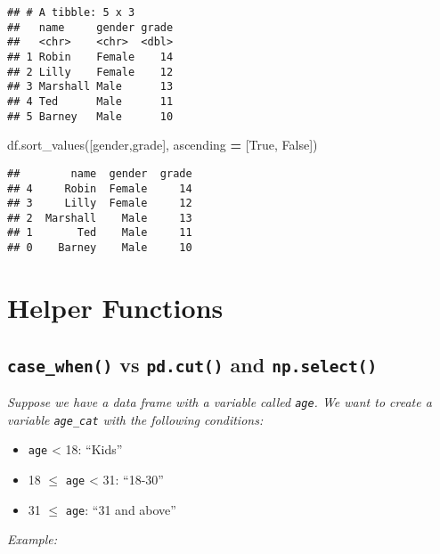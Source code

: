 \documentclass[
]{book}
\newenvironment{Shaded}{\begin{snugshade}}{\end{snugshade}}
\newcommand{\NormalTok}[1]{#1}
\newcommand{\OperatorTok}[1]{\textcolor[rgb]{0.81,0.36,0.00}{\textbf{#1}}}
\newcommand{\StringTok}[1]{\textcolor[rgb]{0.31,0.60,0.02}{#1}}
\newcommand{\VariableTok}[1]{\textcolor[rgb]{0.00,0.00,0.00}{#1}}
\begin{document}
\begin{verbatim}
## # A tibble: 5 x 3
##   name     gender grade
##   <chr>    <chr>  <dbl>
## 1 Robin    Female    14
## 2 Lilly    Female    12
## 3 Marshall Male      13
## 4 Ted      Male      11
## 5 Barney   Male      10
\end{verbatim}

\begin{Shaded}
\begin{Highlighting}[]
\NormalTok{df.sort\_values([}\StringTok{\textquotesingle{}gender\textquotesingle{}}\NormalTok{,}\StringTok{\textquotesingle{}grade\textquotesingle{}}\NormalTok{],}
\NormalTok{                ascending }\OperatorTok{=}\NormalTok{ [}\VariableTok{True}\NormalTok{, }\VariableTok{False}\NormalTok{])}
\end{Highlighting}
\end{Shaded}

\begin{verbatim}
##        name  gender  grade
## 4     Robin  Female     14
## 3     Lilly  Female     12
## 2  Marshall    Male     13
## 1       Ted    Male     11
## 0    Barney    Male     10
\end{verbatim}

\hypertarget{helper-functions}{%
\chapter{Helper Functions}\label{helper-functions}}

\hypertarget{case_when-vs-pd.cut-and-np.select}{%
\section{\texorpdfstring{\texttt{case\_when()} vs \texttt{pd.cut()} and \texttt{np.select()}}{case\_when() vs pd.cut() and np.select()}}\label{case_when-vs-pd.cut-and-np.select}}

\emph{Suppose we have a data frame with a variable called \texttt{age}. We want to create a variable \texttt{age\_cat} with the following conditions:}

\begin{itemize}
\item
  \texttt{age} \textless{} 18: ``Kids''
\item
  18 \(\leq\) \texttt{age} \textless{} 31: ``18-30''
\item
  31 \(\leq\) \texttt{age}: ``31 and above''
\end{itemize}

\emph{Example:}
\end{document}
